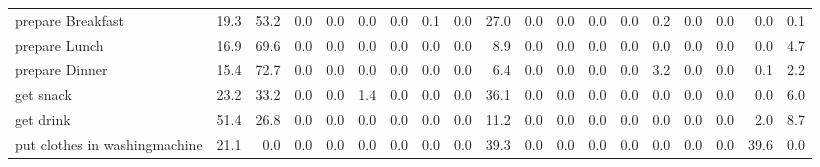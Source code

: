 \documentclass{article}
\begin{document}
\begin{sideways}
\begin{tabular}{lrrrrrrrrrrrrrrrrrr}
prepare Breakfast             &        19.3 &               53.2 &           0.0 &                          0.0 &                0.0 &                0.0 &                        0.1 &          0.0 &             27.0 &                0.0 &                    0.0 &                      0.0 &                  0.0 &                   0.2 &              0.0 &              0.0 &                                  0.0 &          0.1 \\
prepare Lunch                 &        16.9 &               69.6 &           0.0 &                          0.0 &                0.0 &                0.0 &                        0.0 &          0.0 &              8.9 &                0.0 &                    0.0 &                      0.0 &                  0.0 &                   0.0 &              0.0 &              0.0 &                                  0.0 &          4.7 \\
prepare Dinner                &        15.4 &               72.7 &           0.0 &                          0.0 &                0.0 &                0.0 &                        0.0 &          0.0 &              6.4 &                0.0 &                    0.0 &                      0.0 &                  0.0 &                   3.2 &              0.0 &              0.0 &                                  0.1 &          2.2 \\
get snack                     &        23.2 &               33.2 &           0.0 &                          0.0 &                1.4 &                0.0 &                        0.0 &          0.0 &             36.1 &                0.0 &                    0.0 &                      0.0 &                  0.0 &                   0.0 &              0.0 &              0.0 &                                  0.0 &          6.0 \\
get drink                     &        51.4 &               26.8 &           0.0 &                          0.0 &                0.0 &                0.0 &                        0.0 &          0.0 &             11.2 &                0.0 &                    0.0 &                      0.0 &                  0.0 &                   0.0 &              0.0 &              0.0 &                                  2.0 &          8.7 \\
put clothes in washingmachine &        21.1 &                0.0 &           0.0 &                          0.0 &                0.0 &                0.0 &                        0.0 &          0.0 &             39.3 &                0.0 &                    0.0 &                      0.0 &                  0.0 &                   0.0 &              0.0 &              0.0 &                                 39.6 &          0.0 \\

\end{tabular}
\end{sideways}
\end{document}
